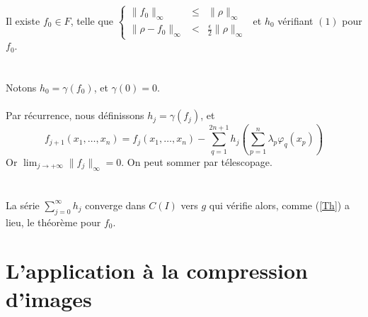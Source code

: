 \documentclass[8pt,a9paper]{beamer} \usepackage[utf8]{inputenc} \usepackage[francais]{babel} \usepackage[T1]{fontenc}
\begin{document}
\begin{frame}
	Il existe $f_0 \in F$, telle que
		$\left\lbrace \begin{array}{ccc} \|f_0\|_\infty &\leqslant &\|\rho\|_\infty \\ \|\rho-f_0\|_\infty &<&\frac{\epsilon}{2} \|\rho\|_\infty\end{array} \right.$
		et $h_0$ vérifiant $(1)$ pour $f_0$.\\
	\textbf{\\}
	\textbf{\\}
	Notons $h_0= \gamma(f_0)$, et $\gamma(0)=0$.\\
	\textbf{\\}
	Par récurrence, nous définissons $h_j = \gamma(f_j)$, et
	\begin{equation} \label{Termesérie}
	f_{j+1}(x_1,…,x_n)= f_j(x_1,…, x_n) - \sum_{q=1}^{2n+1} h_j\left( \sum_{p=1}^n \lambda_p \varphi_q(x_p)\right)
	\end{equation}
	Or $\displaystyle \lim_{j \to +\infty} \|f_j\|_\infty = 0$. On peut sommer par télescopage.\\
	\textbf{\\}
	\textbf{\\}
	La série $\sum_{j=0}^\infty h_j$ converge dans $C(I)$ vers $g$ qui vérifie alors, comme (\ref{Th}) a lieu, le théorème pour $f_0$.\\
\end{frame}

\section{L'application à la compression d'images}
\end{document}

